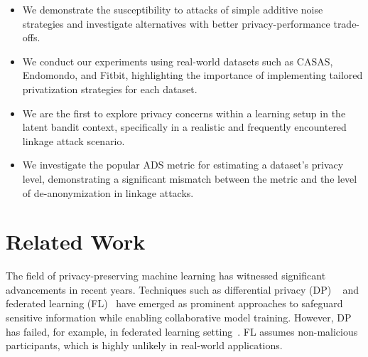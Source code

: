\documentclass{article}
\begin{document}
\begin{itemize}

    \item We demonstrate the susceptibility to attacks of simple additive noise strategies and investigate alternatives with better privacy-performance trade-offs.

    \item We conduct our experiments using real-world datasets such as CASAS, Endomondo, and Fitbit, highlighting the importance of implementing tailored privatization strategies for each dataset.
    

    \item We are the first to explore privacy concerns within a learning setup in the latent bandit context, specifically in a realistic and frequently encountered linkage attack scenario.
    
    
    \item We investigate the popular ADS metric for estimating a dataset's privacy level, demonstrating a significant mismatch between the metric and the level of de-anonymization in linkage attacks.  
\end{itemize}



\section{Related Work}

The field of privacy-preserving machine learning has witnessed significant advancements in recent years. Techniques such as differential privacy (DP) ~\citep{dwork2014algorithmic} and federated learning (FL)~\citep{mcmahan17a} have emerged as prominent approaches to safeguard sensitive information while enabling collaborative model training. However, DP has failed, for example, in federated learning setting~\citep{wang2021protecting}. FL assumes non-malicious participants, which is highly unlikely in real-world applications.
\end{document}
